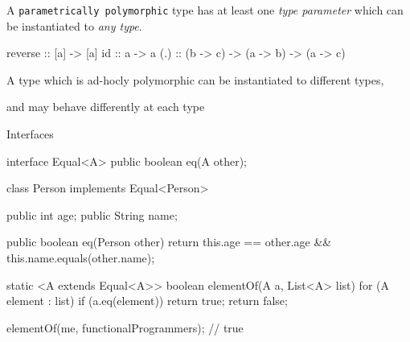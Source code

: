 \documentclass[usenames,dvipsnames,svgnames,table,aspectratio=169,mathserif]{beamer}
\newcommand{\nl}{\vspace{\baselineskip}}
\newcommand{\pnl}{\pause \nl}
\begin{document}
\begin{frame}[fragile]

A {\tt parametrically polymorphic} type has at least one {\it type parameter}
which can be instantiated to {\it any type}.

\nl



\begin{haskellcode}
reverse :: [a] -> [a]
id :: a -> a
(.) :: (b -> c) -> (a -> b) -> (a -> c)
\end{haskellcode}

\end{frame}


\begin{frame}[fragile]

A type which is ad-hocly polymorphic can be instantiated to different types,

and may behave differently at each type

\end{frame}




\begin{frame}
\begin{center}
\huge{Interfaces}
\end{center}
\end{frame}


\begin{frame}[fragile]
\begin{javacode}
interface Equal<A> {
  public boolean eq(A other);
}
\end{javacode}

\pause

\begin{javacode}
class Person implements Equal<Person> {
  public int age;
  public String name;

  public boolean eq(Person other) {
    return this.age == other.age && this.name.equals(other.name);
  }
}
\end{javacode}
\end{frame}


\begin{frame}[fragile]
\begin{javacode}
static <A extends Equal<A>> boolean elementOf(A a, List<A> list) {
  for (A element : list) {
    if (a.eq(element)) return true;
  }
  return false;
}
\end{javacode}

\pnl

\begin{javacode}
elementOf(me, functionalProgrammers);
// true
\end{javacode}
\end{frame}
\end{document}
